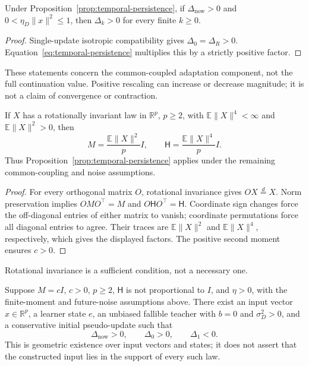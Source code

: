 \begin{transportcorollary}
Under Proposition~\ref{prop:temporal-persistence}, if
$\Delta_{\mathrm{now}}>0$ and $0<\eta_D\|x\|^2\leq1$, then
$\Delta_k>0$ for every finite $k\geq0$.
\end{transportcorollary}
\begin{proof}
Single-update isotropic compatibility gives $\Delta_0=\Delta_R>0$.
Equation~\eqref{eq:temporal-persistence} multiplies this by a strictly
positive factor.
\end{proof}
These statements concern the common-coupled adaptation component, not
the full continuation value. Positive rescaling can increase or decrease
magnitude; it is not a claim of convergence or contraction.

\begin{transportcorollary}
If $X$ has a rotationally invariant law in $\mathbb R^p$, $p\geq2$,
with $\mathbb E\|X\|^4<\infty$ and $\mathbb E\|X\|^2>0$, then
\begin{equation}
    M=\frac{\mathbb E\|X\|^2}{p}I,\qquad
    \mathsf H=\frac{\mathbb E\|X\|^4}{p}I.
\end{equation}
Thus Proposition~\ref{prop:temporal-persistence} applies under the
remaining common-coupling and noise assumptions.
\end{transportcorollary}
\begin{proof}
For every orthogonal matrix $O$, rotational invariance gives
$OX\stackrel{d}{=}X$. Norm preservation implies
$OMO^\top=M$ and $O\mathsf HO^\top=\mathsf H$. Coordinate sign changes
force the off-diagonal entries of either matrix to vanish; coordinate
permutations force all diagonal entries to agree. Their traces are
$\mathbb E\|X\|^2$ and $\mathbb E\|X\|^4$, respectively, which gives
the displayed factors. The positive second moment ensures $c>0$.
\end{proof}
Rotational invariance is a sufficient condition, not a necessary one.

\begin{theorem}
\label{thm:temporal-reversal}
Suppose $M=cI$, $c>0$, $p\geq2$, $\mathsf H$ is not proportional to $I$,
and $\eta>0$, with the finite-moment and future-noise assumptions above.
There exist an input vector $x\in\mathbb R^p$, a learner state $e$, an
unbiased fallible teacher with $b=0$ and $\sigma_D^2>0$, and a conservative
initial pseudo-update such that
\begin{equation}
    \Delta_{\mathrm{now}}>0,\qquad \Delta_0>0,\qquad \Delta_1<0.
\end{equation}
This is geometric existence over input vectors and states; it does not
assert that the constructed input lies in the support of every such law.
\end{theorem}

